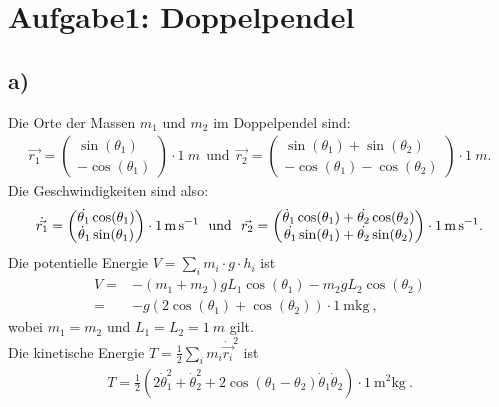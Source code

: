 
\section*{Aufgabe1: Doppelpendel}
\subsection*{a)}
Die Orte der Massen $m_1$ und $m_2$ im Doppelpendel sind:
\begin{align}
\vec{r_1}=\begin{pmatrix}\sin(\theta_1)\\-\cos(\theta_1)\end{pmatrix}
\cdot\SI{1}{m}~~\text{und}~~
\vec{r_2}=\begin{pmatrix}\sin(\theta_1)+\sin(\theta_2)\\-\cos(\theta_1)-\cos(\theta_2)\end{pmatrix}\cdot\SI{1}{m}.
\end{align}
Die Geschwindigkeiten sind also:
\begin{align}
\dot{\vec{r_1}}=\begin{pmatrix}\dot{\theta_1}\cos(\theta_1)\\\dot\theta_1\sin(\theta_1)\end{pmatrix}\cdot\SI{1}{\meter\per\second}
~~\text{und}~~
\vec{r_2}=\begin{pmatrix}\dot\theta_1\cos(\theta_1)+\dot{\theta_2}\cos(\theta_2)\\\-\dot{\theta_1}\sin(\theta_1)+\dot{\theta_2}\sin(\theta_2)\end{pmatrix}\cdot\SI{1}{\meter\per\second}.
\end{align}
Die potentielle Energie $V=\sum\limits_{i}m_i\cdot g\cdot h_i$ ist
\begin{align}
V=&-(m_1+m_2)gL_1\cos(\theta_1)-m_2gL_2\cos(\theta_2)\\
=&-g(2\cos(\theta_1)+\cos(\theta_2))\cdot\SI{1}{\meter\kilogram}~,
\end{align}
wobei $m_1=m_2$ und $L_1=L_2=\SI{1}{m}$ gilt.\\
Die kinetische Energie $T=\frac{1}{2}\sum\limits_{i}m_i{\dot{\vec{r_i}}}^2$ ist
\begin{align}
T=\frac{1}{2}\left(2\dot\theta_1^2+\dot\theta_2^2+2\cos(\theta_1-\theta_2)\dot\theta_1\dot\theta_2\right)\cdot\SI{1}{\square\meter\kilogram}~.
\end{align}

